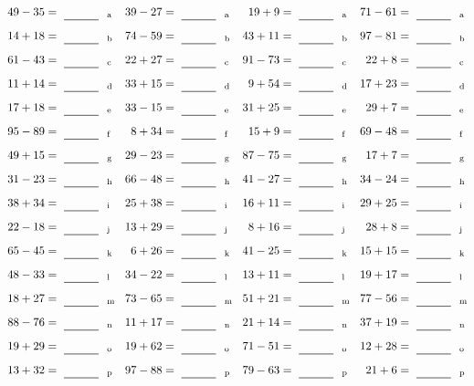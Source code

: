 \documentclass
[
  draft    = true,
  fontsize = 11pt,
  parskip  = half-
]
{scrartcl}
\begin{document}
\clearpage
\begin{align*}
    \pline{49-35}&=\rline{a}
  & \pline{39-27}&=\rline{a}
  & \pline{19+9}&=\rline{a}
  & \pline{71-61}&=\rline{a} \\[1ex]
    \pline{14+18}&=\rline{b}
  & \pline{74-59}&=\rline{b}
  & \pline{43+11}&=\rline{b}
  & \pline{97-81}&=\rline{b} \\[1ex]
    \pline{61-43}&=\rline{c}
  & \pline{22+27}&=\rline{c}
  & \pline{91-73}&=\rline{c}
  & \pline{22+8}&=\rline{c} \\[1ex]
    \pline{11+14}&=\rline{d}
  & \pline{33+15}&=\rline{d}
  & \pline{9+54}&=\rline{d}
  & \pline{17+23}&=\rline{d} \\[1ex]
    \pline{17+18}&=\rline{e}
  & \pline{33-15}&=\rline{e}
  & \pline{31+25}&=\rline{e}
  & \pline{29+7}&=\rline{e} \\[1ex]
    \pline{95-89}&=\rline{f}
  & \pline{8+34}&=\rline{f}
  & \pline{15+9}&=\rline{f}
  & \pline{69-48}&=\rline{f} \\[1ex]
    \pline{49+15}&=\rline{g}
  & \pline{29-23}&=\rline{g}
  & \pline{87-75}&=\rline{g}
  & \pline{17+7}&=\rline{g} \\[1ex]
    \pline{31-23}&=\rline{h}
  & \pline{66-48}&=\rline{h}
  & \pline{41-27}&=\rline{h}
  & \pline{34-24}&=\rline{h} \\[1ex]
    \pline{38+34}&=\rline{i}
  & \pline{25+38}&=\rline{i}
  & \pline{16+11}&=\rline{i}
  & \pline{29+25}&=\rline{i} \\[1ex]
    \pline{22-18}&=\rline{j}
  & \pline{13+29}&=\rline{j}
  & \pline{8+16}&=\rline{j}
  & \pline{28+8}&=\rline{j} \\[1ex]
    \pline{65-45}&=\rline{k}
  & \pline{6+26}&=\rline{k}
  & \pline{41-25}&=\rline{k}
  & \pline{15+15}&=\rline{k} \\[1ex]
    \pline{48-33}&=\rline{l}
  & \pline{34-22}&=\rline{l}
  & \pline{13+11}&=\rline{l}
  & \pline{19+17}&=\rline{l} \\[1ex]
    \pline{18+27}&=\rline{m}
  & \pline{73-65}&=\rline{m}
  & \pline{51+21}&=\rline{m}
  & \pline{77-56}&=\rline{m} \\[1ex]
    \pline{88-76}&=\rline{n}
  & \pline{11+17}&=\rline{n}
  & \pline{21+14}&=\rline{n}
  & \pline{37+19}&=\rline{n} \\[1ex]
    \pline{19+29}&=\rline{o}
  & \pline{19+62}&=\rline{o}
  & \pline{71-51}&=\rline{o}
  & \pline{12+28}&=\rline{o} \\[1ex]
    \pline{13+32}&=\rline{p}
  & \pline{97-88}&=\rline{p}
  & \pline{79-63}&=\rline{p}
  & \pline{21+6}&=\rline{p}
\end{align*}
\end{document}
